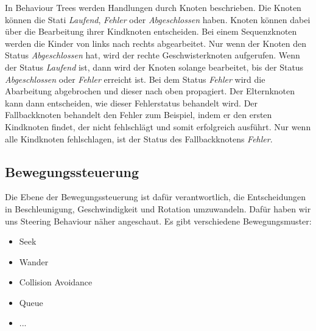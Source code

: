 In Behaviour Trees werden Handlungen durch Knoten beschrieben. Die Knoten können die Stati \textit{Laufend}, \textit{Fehler} oder \textit{Abgeschlossen} haben.
Knoten können dabei über die Bearbeitung ihrer Kindknoten entscheiden. Bei einem Sequenzknoten werden die Kinder von links nach rechts abgearbeitet. Nur wenn der Knoten den Status \textit{Abgeschlossen} hat, wird der rechte Geschwisterknoten aufgerufen. Wenn der Status \textit{Laufend} ist, dann wird der Knoten solange bearbeitet, bis der Status \textit{Abgeschlossen} oder \textit{Fehler} erreicht ist. Bei dem Status \textit{Fehler} wird die Abarbeitung abgebrochen und dieser nach oben propagiert. Der Elternknoten kann dann entscheiden, wie dieser Fehlerstatus behandelt wird.
Der Fallbackknoten behandelt den Fehler zum Beispiel, indem er den ersten Kindknoten findet, der nicht fehlschlägt und somit erfolgreich ausführt. Nur wenn alle Kindknoten fehlschlagen, ist der Status des Fallbackknotens \textit{Fehler}.

\subsection{Bewegungssteuerung}

Die Ebene der Bewegungssteuerung ist dafür verantwortlich, die Entscheidungen in Beschleunigung, Geschwindigkeit und Rotation umzuwandeln. Dafür haben wir uns Steering Behaviour \cite{SteeringBehaviour} näher angeschaut. Es gibt verschiedene Bewegungsmuster:

\begin{itemize}
\item Seek
\item Wander
\item Collision Avoidance
\item Queue
\item ...
\end{itemize}

